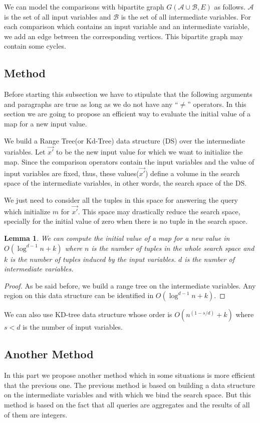 \documentclass[12pt]{article}
\newtheorem{lemma}{Lemma}
\begin{document}
We can model the comparisons with bipartite graph $G(\mathcal{A}\cup \mathcal{B}, E)$ as follows. $\mathcal{A}$ is the set of all input variables and $\mathcal{B}$ is the set of all intermediate variables. For each comparison which contains an input variable and an intermediate variable, we add an edge between the corresponding vertices. This bipartite graph may contain some cycles.

\subsection{Method}
Before starting this subsection we have to stipulate that the following arguments and paragraphs are true as long as we do not have any ``$\neq$'' operators.
In this section we are going to propose an efficient way to evaluate the initial value of a map for a new input value.

We build a Range Tree(or Kd-Tree) data structure (DS) over the intermediate variables. Let $\vec{x'}$ to be the new input value for which we want to initialize the map. Since the comparison operators contain the input variables and the value of input variables are fixed, thus, these values($\vec{x'}$) define a volume in the search space of the intermediate variables, in other words, the search space of the DS.

We just need to consider all the tuples in this space for answering the query which initialize $m$ for $\vec{x'}$. This space may drastically reduce the search space, specially for the initial value of zero when there is no tuple in the search space.

\begin{lemma}
\label{lemma1}
We can compute the initial value of a map for a new value in $O(\log^{d-1}{n} +k)$ where $n$ is the number of tuples in the whole search space and $k$ is the number of tuples induced by the input variables. $d$ is the number of intermediate variables.
\end{lemma}
\begin{proof}
As be said before, we build a range tree on the intermediate variables. Any region on this data structure can be identified in $O(\log^{d-1}{n}+k)$. 
\end{proof}
We can also use KD-tree data structure whose order is $O(n^{(1-s/d)}+k)$ where $s<d$  is the number of input variables. 
\subsection{Another Method}
In this part we propose another method which in some situations is more efficient that the previous one. The previous method is based on building a data structure on the intermediate variables and with which we bind the search space. But this method is based on the fact that all queries are aggregates and the results of all of them are integers. \par
\end{document}
